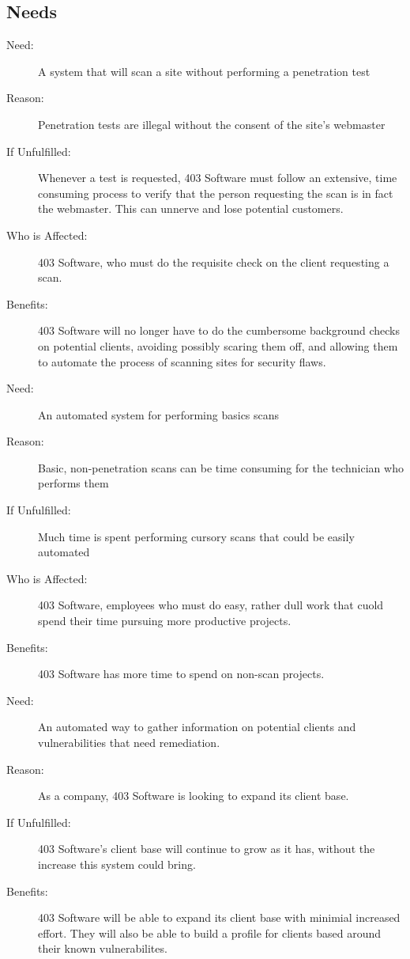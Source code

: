 \subsection{Needs}
\begin{description}
\item[Need: ]{A system that will scan a site without performing a penetration test}
\item[Reason: ]{Penetration tests are illegal without the consent of the site's webmaster}
\item[If Unfulfilled: ]{Whenever a test is requested, 403 Software must follow an extensive, time consuming process to verify that the person requesting the scan is in fact the webmaster.  This can unnerve and lose potential customers.}
\item[Who is Affected:]{403 Software, who must do the requisite check on the client requesting a scan.}
\item[Benefits:]{403 Software will no longer have to do the cumbersome background checks on potential clients, avoiding possibly scaring them off, and allowing them to automate the process of scanning sites for security flaws.}\\
\item[Need: ]{An automated system for performing basics scans}
\item[Reason: ]{Basic, non-penetration scans can be time consuming for the technician who performs them}\item[If Unfulfilled:	]{Much time is spent performing cursory scans that could be easily automated}\item[Who is Affected:	]{403 Software, employees who must do easy, rather dull work that cuold spend their time pursuing more productive projects.}
\item[Benefits:	]{403 Software has more time to spend on non-scan projects. }\\
\item[Need: ]{An automated way to gather information on potential clients and vulnerabilities that need remediation.}
\item[Reason:	]{As a company, 403 Software is looking to expand its client base.}
\item[If Unfulfilled:	]{403 Software's client base will continue to grow as it has, without the increase this system could bring.}
\item[Benefits: ]{403 Software will be able to expand its client base with minimial increased effort.  They will also be able to build a profile for clients based around their known vulnerabilites.}
\end{description}

